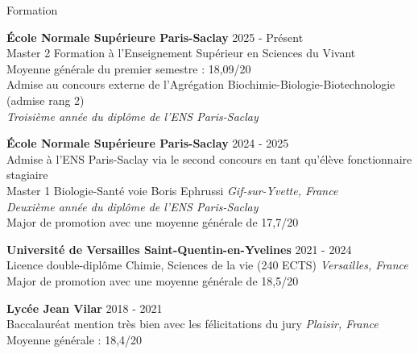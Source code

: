\documentclass[
	10pt,
]{style} %
\begin{document}
\begin{rSection}{Formation}

	\textbf{École Normale Supérieure Paris-Saclay} \hfill 2025 - Présent \\
	Master 2 Formation à l'Enseignement Supérieur en Sciences du Vivant \\
	Moyenne générale du premier semestre : 18,09/20 \\
	Admise au concours externe de l'Agrégation Biochimie-Biologie-Biotechnologie (admise rang 2) \hfill \\
	\textit{Troisième année du diplôme de l'ENS Paris-Saclay}

	\vspace{0.5mm}

	\textbf{École Normale Supérieure Paris-Saclay} \hfill 2024 - 2025 \\
	Admise à l'ENS Paris-Saclay via le second concours en tant qu'élève fonctionnaire stagiaire \\
	Master 1 Biologie-Santé voie Boris Ephrussi \hfill \textit{Gif-sur-Yvette, France} \\
	\textit{Deuxième année du diplôme de l'ENS Paris-Saclay} \\
	Major de promotion avec une moyenne générale de 17,7/20
	\vspace{0.5mm}

	\textbf{Université de Versailles Saint-Quentin-en-Yvelines} \hfill 2021 - 2024 \\
	Licence double-diplôme Chimie, Sciences de la vie (240 ECTS) \hfill \textit{Versailles, France} \\
	Major de promotion avec une moyenne générale de 18,5/20

	\vspace{0.5mm}

	\textbf{Lycée Jean Vilar} \hfill 2018 - 2021 \\
	Baccalauréat mention très bien avec les félicitations du jury \hfill \textit{Plaisir, France} \\
	Moyenne générale : 18,4/20
\end{rSection}

\end{document}
